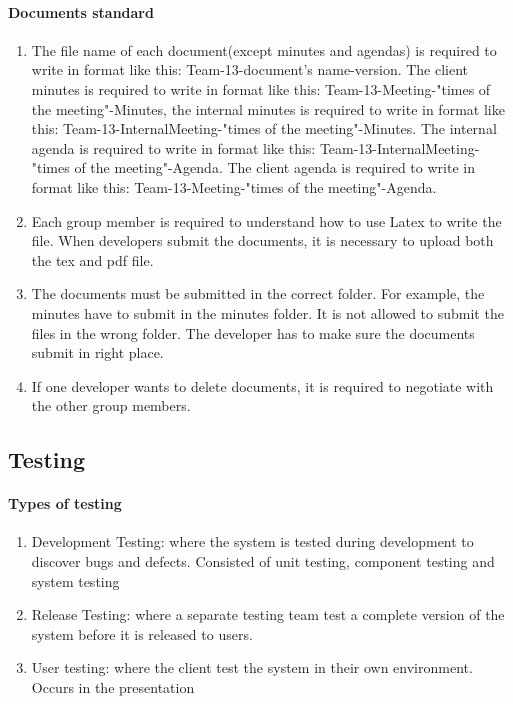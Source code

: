 \documentclass[11pt, a4paper]{report}
\begin{document}
\paragraph{Documents standard}

\begin{enumerate}
	\item The file name of each document(except minutes and agendas) is required to write in format like this: Team-13-document's name-version. The client minutes is required to write in format like this:
	Team-13-Meeting-"times of the meeting"-Minutes, the internal minutes is required to write in format like this: Team-13-InternalMeeting-"times of the meeting"-Minutes. The internal agenda is required to write in format like this: Team-13-InternalMeeting-"times of the meeting"-Agenda. The client agenda is required to write in format like this: Team-13-Meeting-"times of the meeting"-Agenda. 
	\item Each group member is required to understand how to use Latex to write the file. When developers submit the documents, it is necessary to upload both the tex and pdf file.
	\item The documents must be submitted in the correct folder. For example, the minutes have to submit in the minutes folder. It is not allowed to submit the files in the wrong folder. The developer has to make sure the documents submit in right place. 
	\item If one developer wants to delete documents, it is required to negotiate with the other group members. 
\end{enumerate}

\subsection{Testing}

\paragraph{Types of testing}
\begin{enumerate}
  	\item Development Testing: where the system is tested during development to discover bugs
and defects. Consisted of unit testing, component testing and system testing
	\item Release Testing: where a separate testing team test a complete version of the system before it is released to users.
	\item User testing: where the client test the system in their own environment. Occurs in the presentation
\end{enumerate}
\end{document}
